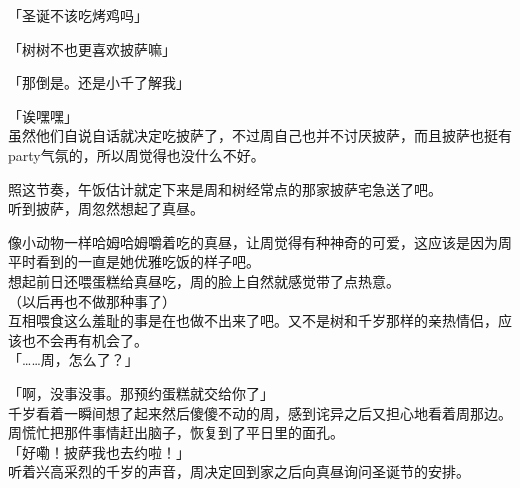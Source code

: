「圣诞不该吃烤鸡吗」

「树树不也更喜欢披萨嘛」

「那倒是。还是小千了解我」

「诶嘿嘿」\\

虽然他们自说自话就决定吃披萨了，不过周自己也并不讨厌披萨，而且披萨也挺有party气氛的，所以周觉得也没什么不好。

照这节奏，午饭估计就定下来是周和树经常点的那家披萨宅急送了吧。\\

听到披萨，周忽然想起了真昼。

像小动物一样哈姆哈姆嚼着吃的真昼，让周觉得有种神奇的可爱，这应该是因为周平时看到的一直是她优雅吃饭的样子吧。\\

想起前日还喂蛋糕给真昼吃，周的脸上自然就感觉带了点热意。\\

（以后再也不做那种事了）\\

互相喂食这么羞耻的事是在也做不出来了吧。又不是树和千岁那样的亲热情侣，应该也不会再有机会了。\\

「……周，怎么了？」

「啊，没事没事。那预约蛋糕就交给你了」\\

千岁看着一瞬间想了起来然后傻傻不动的周，感到诧异之后又担心地看着周那边。周慌忙把那件事情赶出脑子，恢复到了平日里的面孔。\\

「好嘞！披萨我也去约啦！」\\

听着兴高采烈的千岁的声音，周决定回到家之后向真昼询问圣诞节的安排。

